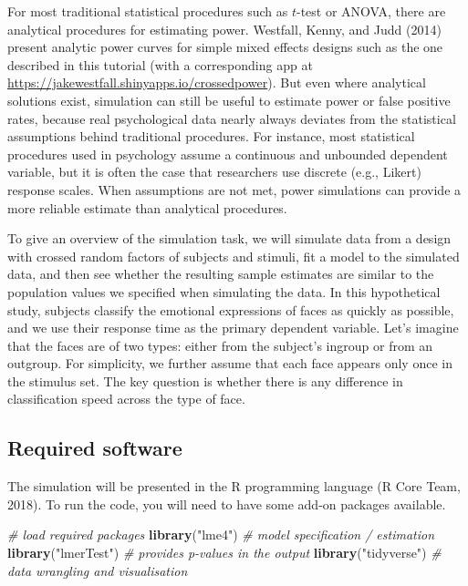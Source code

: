 \documentclass[
  english,
  doc,floatsintext]{apa6}
\newenvironment{Shaded}{\begin{snugshade}}{\end{snugshade}}
\newcommand{\CommentTok}[1]{\textcolor[rgb]{0.56,0.35,0.01}{\textit{#1}}}
\newcommand{\KeywordTok}[1]{\textcolor[rgb]{0.13,0.29,0.53}{\textbf{#1}}}
\newcommand{\NormalTok}[1]{#1}
\newcommand{\StringTok}[1]{\textcolor[rgb]{0.31,0.60,0.02}{#1}}
\begin{document}
For most traditional statistical procedures such as \(t\)-test or ANOVA, there are analytical procedures for estimating power. Westfall, Kenny, and Judd (2014) present analytic power curves for simple mixed effects designs such as the one described in this tutorial (with a corresponding app at \url{https://jakewestfall.shinyapps.io/crossedpower}). But even where analytical solutions exist, simulation can still be useful to estimate power or false positive rates, because real psychological data nearly always deviates from the statistical assumptions behind traditional procedures. For instance, most statistical procedures used in psychology assume a continuous and unbounded dependent variable, but it is often the case that researchers use discrete (e.g., Likert) response scales. When assumptions are not met, power simulations can provide a more reliable estimate than analytical procedures.

To give an overview of the simulation task, we will simulate data from a design with crossed random factors of subjects and stimuli, fit a model to the simulated data, and then see whether the resulting sample estimates are similar to the population values we specified when simulating the data. In this hypothetical study, subjects classify the emotional expressions of faces as quickly as possible, and we use their response time as the primary dependent variable. Let's imagine that the faces are of two types: either from the subject's ingroup or from an outgroup. For simplicity, we further assume that each face appears only once in the stimulus set. The key question is whether there is any difference in classification speed across the type of face.

\hypertarget{required-software}{%
\subsection{Required software}\label{required-software}}

The simulation will be presented in the R programming language (R Core Team, 2018). To run the code, you will need to have some add-on packages available.

\begin{Shaded}
\begin{Highlighting}[]
\CommentTok{# load required packages}
\KeywordTok{library}\NormalTok{(}\StringTok{"lme4"}\NormalTok{)        }\CommentTok{# model specification / estimation}
\KeywordTok{library}\NormalTok{(}\StringTok{"lmerTest"}\NormalTok{)    }\CommentTok{# provides p-values in the output}
\KeywordTok{library}\NormalTok{(}\StringTok{"tidyverse"}\NormalTok{)   }\CommentTok{# data wrangling and visualisation}
\end{Highlighting}
\end{Shaded}
\end{document}
